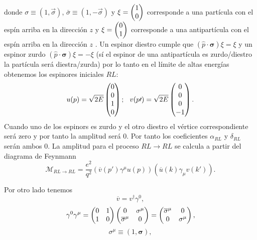 \documentclass{article}
\theoremstyle{plain}
\theoremstyle{definition}
\begin{document}
	donde \(\sigma\equiv\left(1,\vec{\sigma}\right)\), \(\bar{\sigma}\equiv\left(1,-\vec{\sigma}\right)\) y \(\xi= \left(\begin{array}{@{}c@{}}
	1 \\
	0
	\end{array} \right)\) corresponde a una partícula con el espín arriba en la dirección \(z\) y \(\xi= \left(\begin{array}{@{}c@{}}
	0 \\
	1
	\end{array} \right)\) corresponde a una antipartícula con el espín arriba en la dirección \(z\) . Un espinor diestro cumple que \((\hat{p}\cdot\boldsymbol{\sigma})\xi = \xi \)
	y un espinor zurdo \((\hat{p}\cdot\boldsymbol{\sigma})\xi = - \xi \) (sí el espinor de una antipartícula es zurdo/diestro la partícula será diestra/zurda)  por lo tanto en el límite de altas energías obtenemos los espinores iniciales \(RL\):   \[u(p) = \sqrt{2E} \left(\begin{array}{@{}c@{}}
	0 \\
	0 \\
	1 \\
	0
	\end{array}\right) ;\;\:\: v(p\prime) = \sqrt{2E} \left(\begin{array}{@{}c@{}}
	0 \\
	0 \\
	0 \\
	-1
	\end{array}\right)\text{.}  \] Cuando uno de los  espinors es zurdo y el otro diestro el vértice correspondiente será zero y por tanto la amplitud será 0. Por tanto los coeficientes \(\alpha_{RL} \) y \(\delta_{RL} \) serán ambos 0. La amplitud para el proceso \(RL\rightarrow RL \) se calcula a partir del diagrama de Feynmann
	\[ \mathcal{M}_{RL\rightarrow RL}=\frac{e^2}{q^2}\left(\overline{v}(p\prime)\gamma^{\mu}u(p) \right)\left(\overline{u}(k)\gamma_{\mu}v(k\prime) \right)\text{.} \]  \par \noindent Por otro lado tenemos \[
	\overline{v} = v^{\dagger}\gamma^0,\]
	\[ \gamma^0\gamma^{\mu} = \left(\begin{array}{@{}cc@{}}
	0 & 1\\
	1 & 0 
	\end{array}\right) \left(\begin{array}{@{}cc@{}}
	0 & \sigma^{\mu}\\
	\overline{\sigma}^{\mu} & 0 
	\end{array}\right) = \left(\begin{array}{@{}cc@{}}
	\overline{\sigma}^{\mu} & 0\\
	0 & \sigma^{\mu} 
	\end{array}\right),  \] \[\sigma^{\mu} \equiv \left(
	1 , \boldsymbol{\sigma}
	\right), \]
\end{document}
